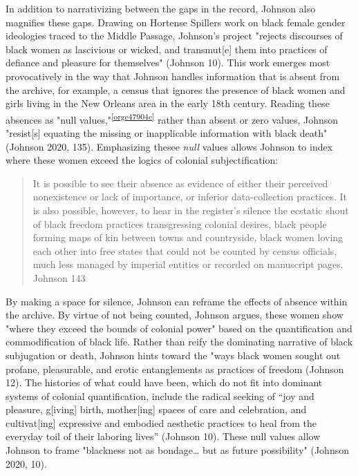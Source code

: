 \documentclass[11pt]{article}
\begin{document}
In addition to narrativizing between the gaps in the record, Johnson
also magnifies these gaps. Drawing on Hortense Spillers work on black
female gender ideologies traced to the Middle Passage, Johnson's
project "rejects discourses of black women as lascivious or wicked,
and transmut[e] them into practices of defiance and pleasure for
themselves" (Johnson 10). This work emerges most provocatively in the
way that Johnson handles information that is absent from the archive,
for example, a census that ignores the presence of black women and
girls living in the New Orleans area in the early 18th
century. Reading these absences as "null values,"\textsuperscript{\ref{orgc47904c}} rather than
absent or zero values, Johnson "resist[s] equating the missing or
inapplicable information with black death" (Johnson 2020,
135). Emphasizing thesee \emph{null} values allows Johnson to index where
these women exceed the logics of colonial subjectification:
\begin{quote}
It is possible to see their absence as evidence of either their
perceived nonexistence or lack of importance, or inferior
data-collection practices. It is also possible, however, to hear in
the register's silence the ecstatic shout of black freedom practices
transgressing colonial desires, black people forming maps of kin
between towns and countryside, black women loving each other into free
states that could not be counted by census officials, much less
managed by imperial entities or recorded on manuscript pages. Johnson
143
\end{quote}
By making a space for silence, Johnson can reframe the effects of
absence within the archive. By virtue of not being counted, Johnson
argues, these women show "where they exceed the bounds of colonial
power" based on the quantification and commodification of black
life. Rather than reify the dominating narrative of black subjugation
or death, Johnson hints toward the "ways black women sought out
profane, pleasurable, and erotic entanglements as practices of freedom
(Johnson 12). The histories of what could have been, which do not fit
into dominant systems of colonial quantification, include the radical
seeking of “joy and pleasure, g[iving] birth, mother[ing] spaces of
care and celebration, and cultivat[ing] expressive and embodied
aesthetic practices to heal from the everyday toil of their laboring
lives” (Johnson 10). These null values allow Johnson to frame
"blackness not as bondage\ldots{} but as future possibility" (Johnson 2020,
10).
\end{document}

